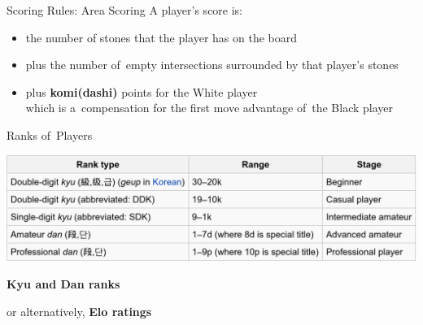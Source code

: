 \documentclass{beamer}
\begin{document}
  {
    \begin{frame}{Scoring Rules: Area Scoring}
      \pause
      A player's score is:
      \begin{itemize}[<+- | alert@+>]
        \item the number of stones that the player has on the board
        \item plus the number of~empty intersections surrounded by that player's stones
        \item plus \textbf{komi(dashi)} points for the White player \\
          {\tiny which is a~compensation for the first move advantage of~the Black player}
      \end{itemize}
    \end{frame}

    \begin{frame}{Ranks of~Players}
      \begin{center}
        \tiny
        \includegraphics[width=\textwidth]{../img/Go_kyu_dan.png}

        \textbf{Kyu and Dan ranks}
      \end{center}
      \pause
      
      or alternatively, \textbf{Elo ratings}
    \end{frame}
  }

\end{document}
